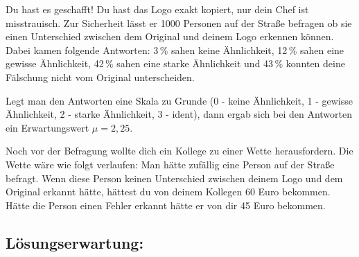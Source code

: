\begin{langesbeispiel}
\begin{aufgabenstellung}
\item %


\item Du hast es geschafft! Du hast das Logo exakt kopiert, nur dein Chef ist misstrauisch. Zur Sicherheit lässt er 1000 Personen auf der Straße befragen ob sie einen Unterschied zwischen dem Original und deinem Logo erkennen können. Dabei kamen folgende Antworten: 3\,\% sahen keine Ähnlichkeit, 12\,\% sahen eine gewisse Ähnlichkeit, 42\,\% sahen eine starke Ähnlichkeit und 43\,\% konnten deine Fälschung nicht vom Original unterscheiden.
	
	Legt man den Antworten eine Skala zu Grunde (0 - keine Ähnlichkeit, 1 - gewisse Ähnlichkeit, 2 - starke Ähnlichkeit, 3 - ident), dann ergab sich bei den Antworten ein Erwartungswert $\mu=2,25$.%


Noch vor der Befragung wollte dich ein Kollege zu einer Wette herausfordern. Die Wette wäre wie folgt verlaufen: Man hätte zufällig eine Person auf der Straße befragt. Wenn diese Person keinen Unterschied zwischen deinem Logo und dem Original erkannt hätte, hättest du von deinem Kollegen 60 Euro bekommen. Hätte die Person einen Fehler erkannt hätte er von dir 45 Euro bekommen.


\end{aufgabenstellung}

\begin{loesung}
\item \subsection{Lösungserwartung:} 



\end{loesung}
\end{langesbeispiel}
